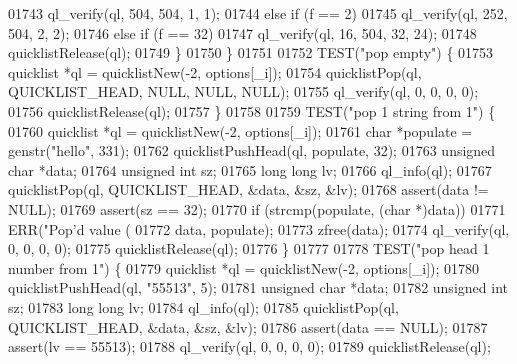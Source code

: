 \begin{DoxyCode}
{{{{{{{{{{{{{{{{{{{{{{{{{{{{{{{{{{{{{{{{{01743                     ql\_verify(ql, 504, 504, 1, 1);
01744                 \textcolor{keywordflow}{else} \textcolor{keywordflow}{if} (f == 2)
01745                     ql\_verify(ql, 252, 504, 2, 2);
01746                 \textcolor{keywordflow}{else} \textcolor{keywordflow}{if} (f == 32)
01747                     ql\_verify(ql, 16, 504, 32, 24);
01748                 quicklistRelease(ql);
01749             \}
01750         \}
01751 
01752         TEST(\textcolor{stringliteral}{"pop empty"}) \{
01753             quicklist *ql = quicklistNew(-2, options[\_i]);
01754             quicklistPop(ql, QUICKLIST\_HEAD, NULL, NULL, NULL);
01755             ql\_verify(ql, 0, 0, 0, 0);
01756             quicklistRelease(ql);
01757         \}
01758 
01759         TEST(\textcolor{stringliteral}{"pop 1 string from 1"}) \{
01760             quicklist *ql = quicklistNew(-2, options[\_i]);
01761             \textcolor{keywordtype}{char} *populate = genstr(\textcolor{stringliteral}{"hello"}, 331);
01762             quicklistPushHead(ql, populate, 32);
01763             \textcolor{keywordtype}{unsigned} \textcolor{keywordtype}{char} *data;
01764             \textcolor{keywordtype}{unsigned} \textcolor{keywordtype}{int} sz;
01765             \textcolor{keywordtype}{long} \textcolor{keywordtype}{long} lv;
01766             ql\_info(ql);
01767             quicklistPop(ql, QUICKLIST\_HEAD, &data, &sz, &lv);
01768             assert(data != NULL);
01769             assert(sz == 32);
01770             \textcolor{keywordflow}{if} (strcmp(populate, (\textcolor{keywordtype}{char} *)data))
01771                 ERR(\textcolor{stringliteral}{"Pop'd value (%
01772                     data, populate);
01773             zfree(data);
01774             ql\_verify(ql, 0, 0, 0, 0);
01775             quicklistRelease(ql);
01776         \}
01777 
01778         TEST(\textcolor{stringliteral}{"pop head 1 number from 1"}) \{
01779             quicklist *ql = quicklistNew(-2, options[\_i]);
01780             quicklistPushHead(ql, \textcolor{stringliteral}{"55513"}, 5);
01781             \textcolor{keywordtype}{unsigned} \textcolor{keywordtype}{char} *data;
01782             \textcolor{keywordtype}{unsigned} \textcolor{keywordtype}{int} sz;
01783             \textcolor{keywordtype}{long} \textcolor{keywordtype}{long} lv;
01784             ql\_info(ql);
01785             quicklistPop(ql, QUICKLIST\_HEAD, &data, &sz, &lv);
01786             assert(data == NULL);
01787             assert(lv == 55513);
01788             ql\_verify(ql, 0, 0, 0, 0);
01789             quicklistRelease(ql);
}}}}}}}}}}}}}}}}}}}}}}}}}}}}}}}}}}}}}}}}}}
\end{DoxyCode}
